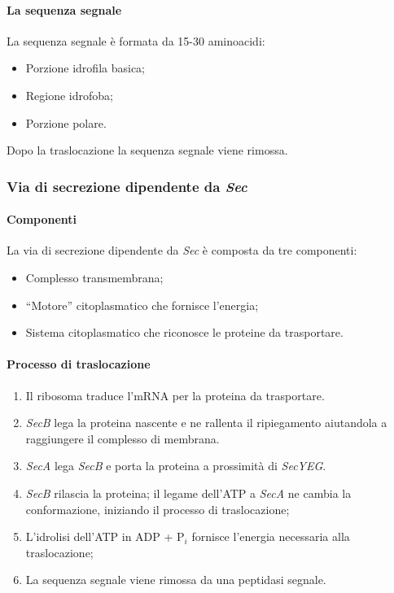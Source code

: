 			\paragraph{La sequenza segnale}
			La sequenza segnale \`e formata da 15-30 aminoacidi:
			\begin{multicols}{2}	
				\begin{itemize}
	 				\item Porzione idrofila basica; 
	    				\item Regione idrofoba; 
	    				\item Porzione polare.
				\end{itemize}
			\end{multicols}
			Dopo la traslocazione la sequenza segnale viene rimossa.
	
		\subsubsection{Via di secrezione dipendente da \emph{Sec}}
			
			\paragraph{Componenti}
			La via di secrezione dipendente da \emph{Sec} \`e composta da tre componenti:
			\begin{multicols}{2}
				\begin{itemize}
			    		\item Complesso transmembrana; 
	    				\item ``Motore'' citoplasmatico che fornisce l'energia; 
	    				\item Sistema citoplasmatico che riconosce le proteine da trasportare.
				\end{itemize}
			\end{multicols}

			\paragraph{Processo di traslocazione}
			\begin{multicols}{2}
				\begin{enumerate}
	    				\item Il ribosoma traduce l'mRNA per la proteina da trasportare.
					\item \emph{SecB} lega la proteina nascente e ne rallenta il ripiegamento aiutandola a raggiungere il complesso di membrana.
					\item \emph{SecA} lega \emph{SecB} e porta la proteina a prossimit\`a di \emph{SecYEG}.
					\item \emph{SecB} rilascia la proteina; il legame dell'ATP a \emph{SecA} ne cambia la conformazione, iniziando il processo di traslocazione; 
	    				\item L'idrolisi dell'ATP in ADP + P$_i$ fornisce l'energia necessaria alla traslocazione;
	    				\item La sequenza segnale viene rimossa da una peptidasi segnale.
				\end{enumerate}
			\end{multicols}
			
